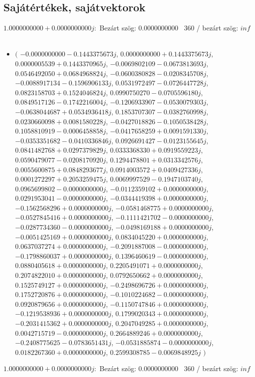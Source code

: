 \documentclass[14pt,a4paper]{article}
\begin{document}
\subsection{Sajátértékek, sajátvektorok}
$1.0000000000+0.0000000000j$:\
Bezárt szög: $0.0000000000$ \
360 / bezárt szög: $inf$\
\begin{itemize}
\item
$\big($
$-0.0000000000-0.1443375673j$, $0.0000000000+0.1443375673j$, $0.0000005539+0.1443370965j$, $-0.0069802109-0.0673813693j$, $0.0546492050+0.0684968824j$, $-0.0600380828-0.0208345708j$, $-0.0088917134-0.1596906133j$, $0.0531972497-0.0726447728j$, $0.0823158703+0.1524046824j$, $0.0990750270-0.0705596180j$, $0.0849517126-0.1742216004j$, $-0.1206933907-0.0530079303j$, $-0.0638044687+0.0534936418j$, $0.1853707307-0.0382760998j$, $0.0230660098+0.0081580228j$, $-0.0427018826-0.1050538428j$, $0.1058810919-0.0006458858j$, $-0.0417658259+0.0091591330j$, $-0.0353351682-0.0410336846j$, $0.0926691427-0.0123155645j$, $0.0841482768+0.0297379829j$, $0.0333368330+0.0919559223j$, $0.0590479077-0.0208170920j$, $0.1294478801+0.0313342576j$, $0.0055600875+0.0848293677j$, $0.0914003572+0.0409427336j$, $0.0001272297+0.2053259475j$, $0.0069997529-0.1947103740j$, $0.0965699802-0.0000000000j$, $-0.0112359102+0.0000000000j$, $0.0291953041-0.0000000000j$, $-0.0344419398+0.0000000000j$, $-0.1562568296+0.0000000000j$, $-0.0581468775+0.0000000000j$, $-0.0527845416+0.0000000000j$, $-0.1111421702-0.0000000000j$, $-0.0287734360-0.0000000000j$, $-0.0498169188+0.0000000000j$, $-0.0051425169+0.0000000000j$, $0.0834045220+0.0000000000j$, $0.0637037274+0.0000000000j$, $-0.2091887008-0.0000000000j$, $-0.1798860037+0.0000000000j$, $0.1396460619-0.0000000000j$, $0.0880405618+0.0000000000j$, $0.2205491071+0.0000000000j$, $0.2074822010+0.0000000000j$, $0.0792650662+0.0000000000j$, $0.1525749127+0.0000000000j$, $-0.2498696726+0.0000000000j$, $0.1752720876+0.0000000000j$, $-0.1010224682-0.0000000000j$, $0.0920879656+0.0000000000j$, $-0.1150747846+0.0000000000j$, $-0.1219538936+0.0000000000j$, $0.1799020343+0.0000000000j$, $-0.2031415362+0.0000000000j$, $0.2047049285+0.0000000000j$, $0.0042715719-0.0000000000j$, $0.2664889246+0.0000000000j$, $-0.2408775625-0.0783651431j$, $-0.0531885874-0.0000000000j$, $0.0182267360+0.0000000000j$, $0.2599308785-0.0069848925j$
$\big)$
\end{itemize}
$1.0000000000+0.0000000000j$:\
Bezárt szög: $0.0000000000$ \
360 / bezárt szög: $inf$\
\end{document}
